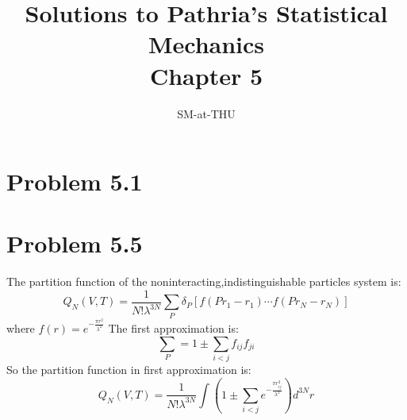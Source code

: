 \documentclass{article}
\author{SM-at-THU}
\title{\bf{Solutions to Pathria's Statistical Mechanics}\\Chapter 5}
\begin{document}
\maketitle
\section*{Problem 5.1}

\section{Problem 5.5} %
\label{sec:problem_5_5}
	
	The partition function of the noninteracting,indistinguishable particles system is:
	$$Q_N(V,T)=\frac{1}{N!\lambda^{3N}}\sum_P \delta_P[f(Pr_1-r_1)\cdots f(Pr_N-r_N)]$$
	where $f(r)=e^{-\frac{\pi r^2}{\lambda^2}}$
	The first approximation is:
	$$\sum_P=1\pm\sum_{i<j}f_{ij}f_{ji}$$
	So the partition function in first approximation is:
	$$Q_N(V,T)=\frac{1}{N!\lambda^{3N}}\int(1\pm\sum_{i<j}e^{-\frac{\pi r_{ij}^2}{\lambda^2}})d^{3N}r$$
\end{document}

